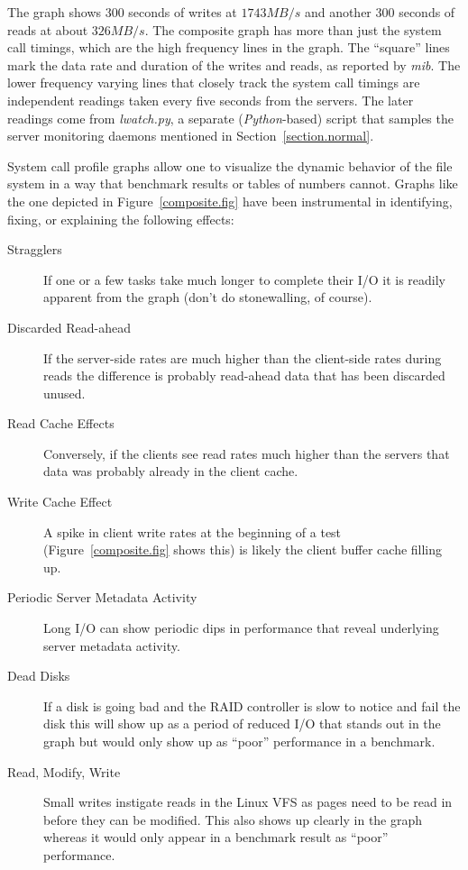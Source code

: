\documentclass{article}
\begin{document}
The graph shows 300 seconds of writes at $1743 MB/s$ and another 300
seconds of reads at about $326 MB/s$.  The composite graph has more
than just the system call timings, which are the high frequency lines
in the graph.  The ``square'' lines mark the data rate and duration of
the writes and reads, as reported by {\em mib}.  The lower frequency
varying lines that closely track the system call timings are
independent readings taken every five seconds from the servers.  The
later readings come from {\em lwatch.py}, a separate ({\em Python}-based)
script that samples the server monitoring daemons mentioned in
Section~\ref{section.normal}.

System call profile graphs allow one to visualize the dynamic behavior
of the file system in a way that benchmark results or tables of
numbers cannot.  Graphs like the one depicted in
Figure~\ref{composite.fig} have been instrumental in identifying,
fixing, or explaining the following effects: 
\begin{description}
\item [Stragglers] If one or a few tasks take much longer to complete
  their I/O it is readily apparent from the graph (don't do
  stonewalling, of course).
\item [Discarded Read-ahead]  If the server-side rates are much
  higher than the client-side rates during reads the difference is
  probably read-ahead data that has been discarded unused.
\item [Read Cache Effects] Conversely, if the clients see read rates
  much higher than the servers that data was probably already in the
  client cache.
\item [Write Cache Effect] A spike in client write rates at the
  beginning of a test (Figure~\ref{composite.fig} shows this) is
  likely the client buffer cache filling up.  
\item [Periodic Server Metadata Activity] Long I/O can show periodic
  dips in performance that reveal underlying server metadata activity.
\item [Dead Disks] If a disk is going bad and the RAID controller is
  slow to notice and fail the disk this will show up as a period of
  reduced I/O that stands out in the graph but would only show up as
  ``poor'' performance in a benchmark.
\item [Read, Modify, Write] Small writes instigate reads in the Linux
  VFS as pages need to be read in before they can be modified.  This
  also shows up clearly in the graph whereas it would only appear in a
  benchmark result as ``poor'' performance.
\end{description}
\end{document}
